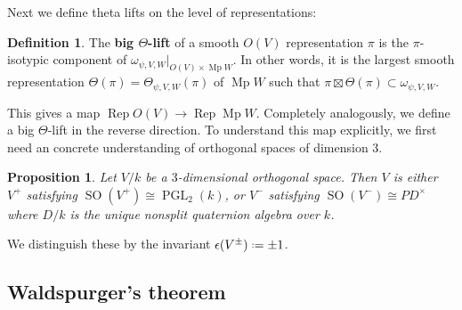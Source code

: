 \documentclass[11pt,a4paper,leqno]{article}
\newcommand{\1}{\mathbbm{1}}
\newcommand*{\defeq}{\mathrel{\vcenter{\baselineskip0.5ex \lineskiplimit0pt
      \hbox{\scriptsize.}\hbox{\scriptsize.}}}%
  =}
\DeclareMathOperator{\Rep}{Rep}
\DeclareMathOperator{\Mp}{Mp}
\DeclareMathOperator{\SO}{SO}
\DeclareMathOperator{\PGL}{PGL}
\theoremstyle{plain}
\newtheorem{prop}[theorem]{Proposition}
\theoremstyle{definition}
\newtheorem{definition}[theorem]{Definition}
\theoremstyle{remark}
\numberwithin{equation}{section}
\begin{document}
Next we define theta lifts on the level of representations:

\begin{definition}\label{def:big-theta}
  The \textbf{big $\Theta$-lift} of a smooth $O(V)$ representation $\pi$ is
  the $\pi$-isotypic component of $\omega_{\psi,V,W}|_{O(V)\times\Mp W}$. In other words, it is the
  largest smooth representation $\Theta(\pi) = \Theta_{\psi,V,W}(\pi)$ of $\Mp W$ such
  that $\pi \boxtimes \Theta(\pi) \subset \omega_{\psi,V,W}$.
\end{definition}
This gives a map $\Rep O(V) \to \Rep \Mp W$. Completely analogously, we
define a big $\Theta$-lift in the reverse direction. To understand this map
explicitly, we first need an concrete understanding of orthogonal
spaces of dimension $3$.
\begin{prop}
  Let $V/k$ be a $3$-dimensional orthogonal space. Then $V$ is either
  $V^{+}$ satisfying $\SO(V^{+}) \cong \PGL_{2}(k)$, or $V^{-}$ satisfying
  $\SO(V^{-}) \cong PD^{\times}$ where $D/k$ is the unique nonsplit quaternion
  algebra over $k$.
\end{prop}
We distinguish these by the invariant $\epsilon(V^{\pm})  \defeq \pm 1$.
\subsection{Waldspurger's theorem}
\label{sec:waldspurgers-theorem}
\end{document}
